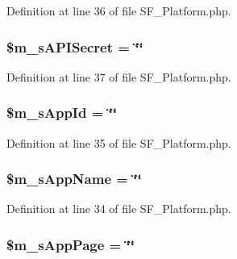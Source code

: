 Definition at line 36 of file SF\_\-Platform.php.

\hypertarget{classSF__Platform_ad25b743c1731f4d58b617a193538c2b0}{
\subsubsection[{\$m\_\-sAPISecret}]{\setlength{\rightskip}{0pt plus 5cm}\$m\_\-sAPISecret = \char`\"{}\char`\"{}}}
\label{classSF__Platform_ad25b743c1731f4d58b617a193538c2b0}


Definition at line 37 of file SF\_\-Platform.php.

\hypertarget{classSF__Platform_acd79de47be3cc9eb08fa4190b5d8a8bb}{
\subsubsection[{\$m\_\-sAppId}]{\setlength{\rightskip}{0pt plus 5cm}\$m\_\-sAppId = \char`\"{}\char`\"{}}}
\label{classSF__Platform_acd79de47be3cc9eb08fa4190b5d8a8bb}


Definition at line 35 of file SF\_\-Platform.php.

\hypertarget{classSF__Platform_a349b224844e6202ccda4da1605f5156b}{
\subsubsection[{\$m\_\-sAppName}]{\setlength{\rightskip}{0pt plus 5cm}\$m\_\-sAppName = \char`\"{}\char`\"{}}}
\label{classSF__Platform_a349b224844e6202ccda4da1605f5156b}


Definition at line 34 of file SF\_\-Platform.php.

\hypertarget{classSF__Platform_ae9ca918bbe92c641557f1ee16a082100}{
\subsubsection[{\$m\_\-sAppPage}]{\setlength{\rightskip}{0pt plus 5cm}\$m\_\-sAppPage = \char`\"{}\char`\"{}}}
\label{classSF__Platform_ae9ca918bbe92c641557f1ee16a082100}


